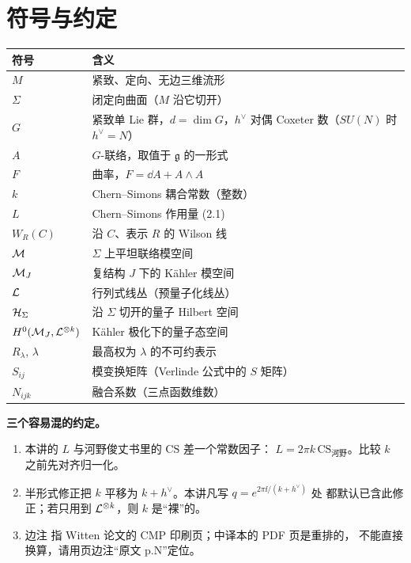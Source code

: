 \appendix
\section{符号与约定}

\begin{center}
\small
\begin{tabular}{@{}ll@{}}
\toprule
符号 & 含义 \\
\midrule
$M$ & 紧致、定向、无边三维流形 \\
$\Sigma$ & 闭定向曲面（$M$ 沿它切开） \\
$G$ & 紧致单 Lie 群，$d=\dim G$，$h^\vee$ 对偶 Coxeter 数（$SU(N)$ 时 $h^\vee=N$） \\
$A$ & $G$-联络，取值于 $\mathfrak g$ 的一形式 \\
$F$ & 曲率，$F=\dd A+A\wedge A$ \\
$k$ & Chern--Simons 耦合常数（整数） \\
$L$ & Chern--Simons 作用量 (2.1) \\
$W_R(C)$ & 沿 $C$、表示 $R$ 的 Wilson 线 \\
$\mathcal{M}$ & $\Sigma$ 上平坦联络模空间 \\
$\mathcal{M}_J$ & 复结构 $J$ 下的 Kähler 模空间 \\
$\mathcal{L}$ & 行列式线丛（预量子化线丛） \\
$\mathcal{H}_\Sigma$ & 沿 $\Sigma$ 切开的量子 Hilbert 空间 \\
$H^0(\mathcal{M}_J,\mathcal{L}^{\otimes k})$ & Kähler 极化下的量子态空间 \\
$R_\lambda$, $\lambda$ & 最高权为 $\lambda$ 的不可约表示 \\
$S_{ij}$ & 模变换矩阵（Verlinde 公式中的 $S$ 矩阵） \\
$N_{ijk}$ & 融合系数（三点函数维数） \\
\bottomrule
\end{tabular}
\end{center}

\noindent\textbf{三个容易混的约定。}
\begin{enumerate}[leftmargin=*]
  \item 本讲的 $L$ 与河野俊丈书里的 $\mathrm{CS}$ 差一个常数因子：
        $L=2\pi k\,\mathrm{CS}_{\text{河野}}$。比较 $k$ 之前先对齐归一化。
  \item 半形式修正把 $k$ 平移为 $k+h^\vee$。本讲凡写 $q=e^{2\pi\ii/(k+h^\vee)}$ 处
        都默认已含此修正；若只用到 $\mathcal{L}^{\otimes k}$，则 $k$ 是“裸”的。
  \item 边注  指 Witten 论文的 CMP 印刷页；中译本的 PDF 页是重排的，
        不能直接换算，请用页边注“原文 p.N”定位。
\end{enumerate}

